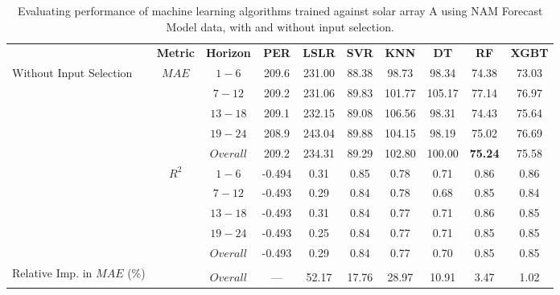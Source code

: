 \begin{table}[h]
\begin{center}
    \caption{Evaluating performance of machine learning algorithms trained against solar array A using NAM Forecast Model data, with and without input selection.}
    \vspace{0.2cm}
    \label{Tab:fs_array_a}
    \begin{tabular}{@{}p{5.3em}ccccccccc@{}}
    \toprule
    & \textbf{Metric} & \textbf{Horizon} & \textbf{PER} & \textbf{LSLR} & \textbf{SVR} & \textbf{KNN} & \textbf{DT} & \textbf{RF} & \textbf{XGBT} \\ \cmidrule(l){1-10} 
    \multirow{10}{5em}{Without Input Selection} & \multirow{5}{*}{$MAE$} & $1 - 6$ & 209.6 & 231.00 & 88.38 & 98.73 & 98.34 & 74.38 & 73.03 \\
                                              &                   & $7 - 12$ & 209.2 & 231.06 & 89.83 & 101.77 & 105.17 & 77.14 & 76.97 \\
                                              &                   & $13 - 18$ & 209.1 & 232.15 & 89.08 & 106.56 & 98.31 & 74.43 & 75.64 \\
                                              &                   & $19 - 24$ & 208.9 & 243.04 & 89.88 & 104.15 & 98.19 & 75.02 & 76.69 \\
                                              &                   & $Overall$ & 209.2 & 234.31 & 89.29 & 102.80 & 100.00 & \textbf{75.24} & 75.58 \\ \cmidrule(lr){2-10}
                                              & \multirow{5}{*}{$R^2$} & $1 - 6$ & -0.494 & 0.31 & 0.85 & 0.78 & 0.71 & 0.86 & 0.86 \\
                                              &                   & $7 - 12$ & -0.493 & 0.29 & 0.84 & 0.78 & 0.68 & 0.85 & 0.84 \\
                                              &                   & $13 - 18$ & -0.493 & 0.31 & 0.84 & 0.77 & 0.71 & 0.86 & 0.85 \\
                                              &                   & $19 - 24$ & -0.493 & 0.25 & 0.84 & 0.77 & 0.71 & 0.85 & 0.85 \\
                                              &                   & $Overall$ & -0.493 & 0.29 & 0.84 & 0.77 & 0.70 & 0.85 & 0.85 \\ 
    \midrule
    \multirow{3}{5em}{Relative Imp. in $MAE$ (\%)} & & & & & & & & & \\
    & & $Overall$ & --- & 52.17 & 17.76 & 28.97 & 10.91 & 3.47 & 1.02 \\ 

\end{tabular}
\end{center}
\end{table}
